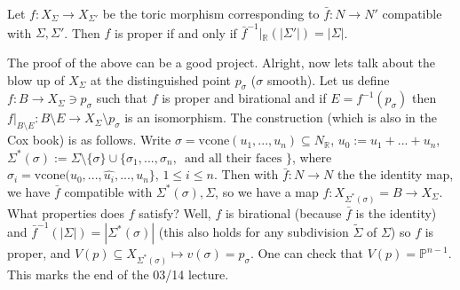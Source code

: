 \documentclass[a4paper,12pt]{amsart}
\newcommand{\R}{\ensuremath{\mathbb{R}}}
\begin{document}
\begin{Theorem}
    Let $f: X_\Sigma \to X_{\Sigma'}$ be the toric morphism corresponding to $\bar{f} : N \to N'$ compatible with $\Sigma, \Sigma'$. Then $f$ is proper if and only if $\bar{f}^{-1}|_{\R} (|\Sigma'|) = |\Sigma|$.
\end{Theorem}
\noindent The proof of the above can be a good project. Alright, now lets talk about the blow up of $X_\Sigma$ at the distinguished point $p_\sigma$ ($\sigma$ smooth). Let us define $f: B \to X_{\Sigma} \ni p_{\sigma}$ such that $f$ is proper and birational and if $E = f^{-1}(p_\sigma)$ then $f|_{B \setminus E} : B \setminus E \to X_{\Sigma} \setminus p_\sigma$ is an isomorphism. The construction (which is also in the Cox book) is as follows. Write $\sigma = \text{vcone}(u_1,...,u_n) \subseteq N_\R$, $u_0 := u_1 + ... + u_n$, $\Sigma^* (\sigma) := \Sigma \setminus \{\sigma\} \cup \{\sigma_1,...,\sigma_n, \, \text{ and all their faces } \}$, where $\sigma_i = \text{vcone} (u_0, ..., \hat{u_i}, ..., u_n \}$, $1 \leq i \leq n$. Then with $\bar{f}: N \to N$ the the identity map, we have $\bar{f}$ compatible with $\Sigma^*(\sigma), \Sigma$, so we have a map $f: X_{\Sigma^*(\sigma)} = B \to X_{\Sigma}$. What properties does $f$ satisfy? Well, $f$ is birational (because $\bar{f}$ is the identity) and $\bar{f}^{-1}(|\Sigma|) = |\Sigma^*(\sigma)|$ (this also holds for any subdivision $\widetilde{\Sigma}$ of $\Sigma$) so $f$ is proper, and $V(p) \subseteq X_{\Sigma^*(\sigma)} \mapsto v(\sigma) = p_\sigma$. One can check that $V(p) = \mathbb{P}^{n-1}$. This marks the end of the 03/14 lecture.
\end{document}
